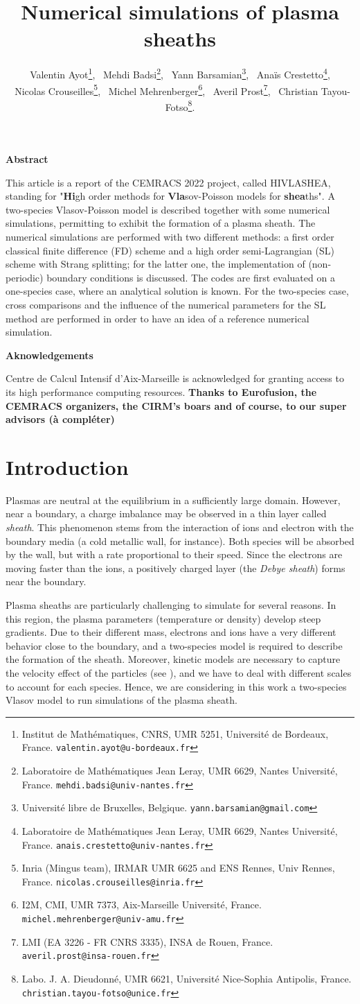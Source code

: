 \documentclass{article}
\title{Numerical simulations of plasma sheaths}
\author{
	Valentin Ayot\footnote{Institut de Math\'ematiques, CNRS, UMR 5251, Universit\'e de Bordeaux, France. \texttt{valentin.ayot@u-bordeaux.fr}}, 
	\ Mehdi Badsi\footnote{Laboratoire de Math\'ematiques Jean Leray, UMR 6629, Nantes Universit\'e, France. \texttt{mehdi.badsi@univ-nantes.fr}},
	\ Yann Barsamian\footnote{Université libre de Bruxelles, Belgique. \texttt{yann.barsamian@gmail.com}}, 
	\ Ana\"is Crestetto\footnote{Laboratoire de Math\'ematiques Jean Leray, UMR 6629, Nantes Universit\'e, France. \texttt{anais.crestetto@univ-nantes.fr}},\\
	\ Nicolas Crouseilles\footnote{Inria (Mingus team), IRMAR UMR 6625 and ENS Rennes, Univ Rennes, France. \texttt{nicolas.crouseilles@inria.fr}},
	\ Michel Mehrenberger\footnote{I2M, CMI, UMR 7373, Aix-Marseille Universit\'e, France. \texttt{michel.mehrenberger@univ-amu.fr}},
	\ Averil Prost\footnote{LMI (EA 3226 - FR CNRS 3335), INSA de Rouen, France. \texttt{averil.prost@insa-rouen.fr}}, 
	\ Christian Tayou-Fotso\footnote{Labo. J. A. Dieudonn\'e, UMR 6621, Universit\'e Nice-Sophia Antipolis, France. \texttt{christian.tayou-fotso@unice.fr}}.
 }
\date{}
\numberwithin{equation}{section}
\newcommand{\todo}[1]{{\color{red}\textbf{#1}}}
\newcommand{\highlight}[2]{ %
	\begin{center}
		\small
		\begin{minipage}{0.9\textwidth}
			\begin{center}
				\textbf{#1}
			\end{center}
			\vspace*{-7pt}
			#2
		\end{minipage}
	\end{center}
}
\begin{document}
	
\maketitle

\highlight{Abstract}{
	This article is a report of the   CEMRACS 2022 project, called HIVLASHEA, standing for "{\bf Hi}gh order methods for {\bf Vla}sov-Poisson models for {\bf shea}ths".
	A two-species Vlasov-Poisson model is described together with some numerical simulations, permitting to exhibit the formation of a plasma sheath. 
	The numerical simulations are performed with two different methods: a first order classical finite difference (FD) scheme and a high order semi-Lagrangian (SL) scheme with Strang splitting; for the latter one, the implementation
	of (non-periodic) boundary conditions is discussed. 
	The codes are first evaluated on a one-species case, where an analytical solution is known. For the two-species case, cross comparisons and the influence of the numerical parameters for the SL method are performed in order to have an idea of a reference numerical simulation.
}

\highlight{Aknowledgements}{
	Centre de Calcul Intensif d'Aix-Marseille is acknowledged for granting access to its high performance computing resources.
	\todo{Thanks to Eurofusion, the CEMRACS organizers, the CIRM's boars and of course, to our super advisors (à compléter)}	
}

\section*{Introduction}

Plasmas are neutral at the equilibrium in a sufficiently large domain. However, near a boundary, a charge imbalance may be observed in a thin layer called \emph{sheath}.
This phenomenon stems from the interaction of ions and electron with the boundary media (a cold metallic wall, for instance). Both species will be absorbed by the wall, but with a rate proportional to their speed. Since the electrons are moving %
faster than the ions, a positively charged layer (the \emph{Debye sheath}) forms near the boundary. 

Plasma sheaths are particularly challenging to simulate for several reasons. In this region, 
the plasma parameters (temperature or density) develop steep gradients. Due to their different mass, 
electrons and ions have a very different behavior close to the boundary, and a two-species model is required 
to describe the formation of the sheath. Moreover, kinetic models are necessary to capture the velocity 
effect of the particles (see \cite{bourneNonUniformSplinesSemiLagrangian2022}), and we have to deal with 
different scales to account for each species.  Hence, we are considering in this work 
a two-species Vlasov model to run simulations of the plasma sheath. 
\end{document}
